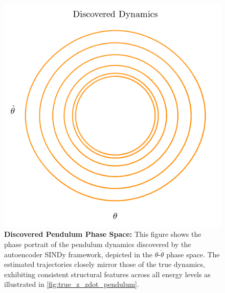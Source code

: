 \begin{figure}[t]
\begin{minipage}[b]{.45\textwidth}
    \includegraphics[width=\textwidth]{project_2/images/z_zdot_discovered.png}
    \vspace{-3mm}
    \caption{\textbf{Discovered Pendulum Phase Space:} This figure shows the phase portrait of the pendulum dynamics discovered by the autoencoder SINDy framework, depicted in the $\theta$-$\dot{\theta}$ phase space. The estimated trajectories closely mirror those of the true dynamics, exhibiting consistent structural features across all energy levels as illustrated in \autoref{fig:true_z_zdot_pendulum}.}
    \label{fig:discovered_z_zdot_pendulum}
\end{minipage}
\end{figure}



